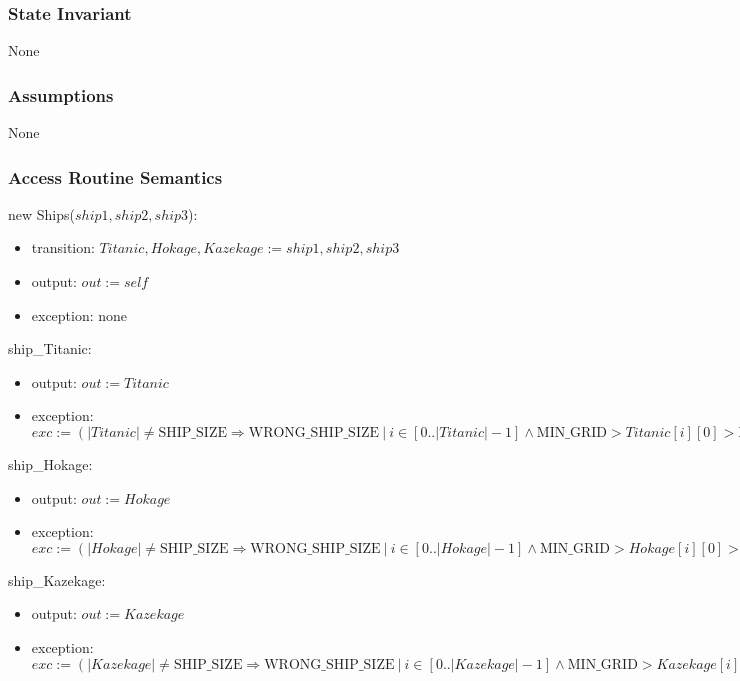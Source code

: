 \documentclass[12pt]{article}
\begin{document}
\subsubsection* {State Invariant}

None

\subsubsection* {Assumptions}

None

\subsubsection* {Access Routine Semantics}

new Ships($ship1, ship2, ship3$):
\begin{itemize}
\item transition: $Titanic, Hokage, Kazekage:= ship1, ship2, ship3$
\item output: $out := \mathit{self}$
\item exception: none
\end{itemize}

\noindent ship\_Titanic:
\begin{itemize}
\item output: $out := Titanic$
\item exception: $exc := (|Titanic| \neq \mathrm{SHIP\_SIZE} \Rightarrow  \mathrm{WRONG\_SHIP\_SIZE} ~ | ~ i \in [0..|Titanic| - 1] \wedge  \mbox{MIN\_GRID} > Titanic[i][0] > \mbox{MAX\_GRID}  \vee  \mbox{MIN\_GRID} > Titanic[i][1] > \mbox{MAX\_GRID} \Rightarrow \mathrm{INVALID\_SHIP\_POSITION})$
\end{itemize}

\noindent ship\_Hokage:
\begin{itemize}
\item output: $out := Hokage$
\item exception: $exc := (|Hokage| \neq \mathrm{SHIP\_SIZE} \Rightarrow  \mathrm{WRONG\_SHIP\_SIZE} ~ | ~ i \in [0..|Hokage| - 1] \wedge  \mbox{MIN\_GRID} > Hokage[i][0] > \mbox{MAX\_GRID}  \vee  \mbox{MIN\_GRID} > Hokage[i][1] > \mbox{MAX\_GRID} \Rightarrow \mathrm{INVALID\_SHIP\_POSITION})$
\end{itemize}

\noindent ship\_Kazekage:
\begin{itemize}
\item output: $out := Kazekage$
\item exception: $exc := (|Kazekage| \neq \mathrm{SHIP\_SIZE} \Rightarrow  \mathrm{WRONG\_SHIP\_SIZE} ~ | ~ i \in [0..|Kazekage| - 1] \wedge  \mbox{MIN\_GRID} > Kazekage[i][0] > \mbox{MAX\_GRID}  \vee  \mbox{MIN\_GRID} > Kazekage[i][1] > \mbox{MAX\_GRID} \Rightarrow \mathrm{INVALID\_SHIP\_POSITION})$
\end{itemize}
\end{document}
